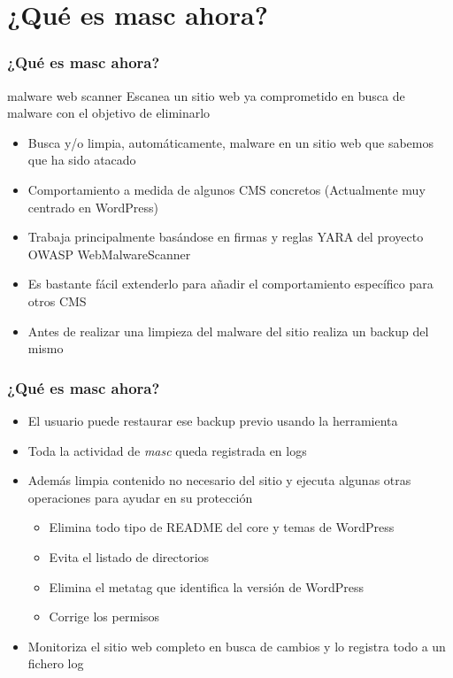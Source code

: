 \documentclass[xcolor={dvipsnames}]{beamer}
\begin{document}
\section{¿Qué es masc ahora?} 
\begin{frame}\frametitle{¿Qué es masc ahora?} 

    \begin{block}{malware web scanner}
    Escanea un sitio web ya comprometido en busca de malware con el objetivo de eliminarlo
    \end{block}

    \begin{itemize}
        \item Busca y/o limpia, automáticamente, malware en un sitio web que sabemos que ha sido atacado
        \item Comportamiento a medida de algunos CMS concretos (Actualmente muy centrado en WordPress)
        \item Trabaja principalmente basándose en firmas y reglas YARA del proyecto OWASP WebMalwareScanner
        \item Es bastante fácil extenderlo para añadir el comportamiento específico para otros CMS
        \item Antes de realizar una limpieza del malware del sitio realiza un backup del mismo
    \end{itemize}
\end{frame}

\begin{frame}\frametitle{¿Qué es masc ahora?}
    \begin{itemize}
        \item El usuario puede restaurar ese backup previo usando la herramienta
        \item Toda la actividad de \emph{masc} queda registrada en logs
        \item Además limpia contenido no necesario del sitio y ejecuta algunas otras operaciones para ayudar en su protección
            \begin{itemize}
                \item Elimina todo tipo de README del core y temas de WordPress
                \item Evita el listado de directorios
                \item Elimina el metatag que identifica la versión de WordPress
                \item Corrige los permisos
            \end{itemize}
        \item Monitoriza el sitio web completo en busca de cambios y lo registra todo a un fichero log
    \end{itemize}
\end{frame}
\end{document}
